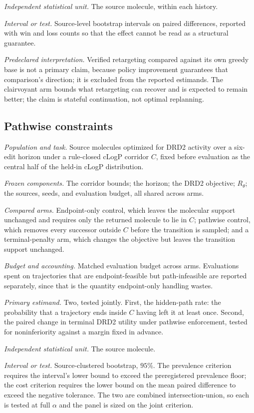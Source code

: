 \emph{Independent statistical unit.} The source molecule, within each history.

\emph{Interval or test.} Source-level bootstrap intervals on paired differences, reported with win and loss counts so that the effect cannot be read as a structural guarantee.

\emph{Predeclared interpretation.} Verified retargeting compared against its own greedy base is not a primary claim, because policy improvement guarantees that comparison's direction; it is excluded from the reported estimands. The clairvoyant arm bounds what retargeting can recover and is expected to remain better; the claim is stateful continuation, not optimal replanning.

\subsection{Pathwise constraints}
\label{app:proto-pathwise}

\emph{Population and task.} Source molecules optimized for DRD2 activity over a six-edit horizon under a rule-closed cLogP corridor $C$, fixed before evaluation as the central half of the held-in cLogP distribution.

\emph{Frozen components.} The corridor bounds; the horizon; the DRD2 objective; $R_\theta$; the sources, seeds, and evaluation budget, all shared across arms.

\emph{Compared arms.} Endpoint-only control, which leaves the molecular support unchanged and requires only the returned molecule to lie in $C$; pathwise control, which removes every successor outside $C$ before the transition is sampled; and a terminal-penalty arm, which changes the objective but leaves the transition support unchanged.

\emph{Budget and accounting.} Matched evaluation budget across arms. Evaluations spent on trajectories that are endpoint-feasible but path-infeasible are reported separately, since that is the quantity endpoint-only handling wastes.

\emph{Primary estimand.} Two, tested jointly. First, the hidden-path rate: the probability that a trajectory ends inside $C$ having left it at least once. Second, the paired change in terminal DRD2 utility under pathwise enforcement, tested for noninferiority against a margin fixed in advance.

\emph{Independent statistical unit.} The source molecule.

\emph{Interval or test.} Source-clustered bootstrap, $95\%$. The prevalence criterion requires the interval's lower bound to exceed the preregistered prevalence floor; the cost criterion requires the lower bound on the mean paired difference to exceed the negative tolerance. The two are combined intersection-union, so each is tested at full $\alpha$ and the panel is sized on the joint criterion.

